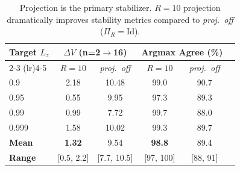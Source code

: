 \begin{table}[t]
\centering
\caption{Projection is the primary stabilizer. $R{=}10$ projection dramatically improves stability metrics compared to \emph{proj.\ off} ($\Pi_R=\mathrm{Id}$).}
\label{tab:exp2_projection_stabilizer}
\begin{tabular}{lccccc}
\toprule
Target $L_z$ & \multicolumn{2}{c}{$\Delta V$ (n=2$\to$16)} & \multicolumn{2}{c}{Argmax Agree (\%)} \\
\cmidrule(lr){2-3} \cmidrule(lr){4-5}
 & $R{=}10$ & \emph{proj.\ off} & $R{=}10$ & \emph{proj.\ off} \\
\midrule
  0.9 & 2.18 & 10.48 & 99.0 & 90.7 \\
  0.95 & 0.55 & 9.95 & 97.3 & 89.3 \\
  0.99 & 0.99 & 7.72 & 99.7 & 88.0 \\
  0.999 & 1.58 & 10.02 & 99.3 & 89.7 \\
\midrule
  \textbf{Mean} & \textbf{1.32} & 9.54 & \textbf{98.8} & 89.4 \\
  \textbf{Range} & [0.5, 2.2] & [7.7, 10.5] & [97, 100] & [88, 91] \\
\bottomrule
\end{tabular}
\end{table}
